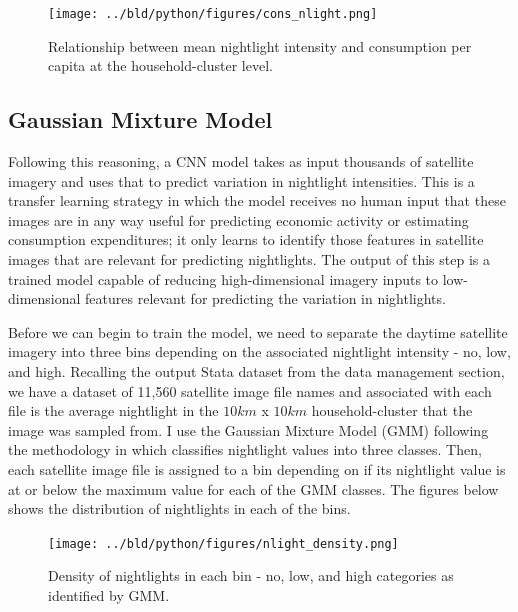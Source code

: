 \documentclass[11pt, a4paper, leqno]{article}
\begin{document}
\begin{figure}[H]

\centering
    \texttt{[image: ../bld/python/figures/cons\_nlight.png]}
    \caption{Relationship between mean nightlight intensity and consumption per capita at the household-cluster level.}
    \label{fig:python-predictions}

\end{figure}

\subsection{Gaussian Mixture Model}

Following this reasoning, a CNN model takes as input thousands of satellite imagery and uses that to predict variation in nightlight intensities. This is a transfer learning strategy in which the model receives no human input that these images are in any way useful for predicting economic activity or estimating consumption expenditures; it only learns to identify those features in satellite images that are relevant for predicting nightlights. The output of this step is a trained model capable of reducing high-dimensional imagery inputs to low-dimensional features relevant for predicting the variation in nightlights.

Before we can begin to train the model, we need to separate the daytime satellite imagery into three bins depending on the associated nightlight intensity - no, low, and high. Recalling the output Stata dataset from the data management section, we have a dataset of 11,560 satellite image file names and associated with each file is the average nightlight in the $10km$ x $10km$ household-cluster that the image was sampled from. I use the Gaussian Mixture Model (GMM) following the methodology in \citet{jean2016combining} which classifies nightlight values into three classes. Then, each satellite image file is assigned to a bin depending on if its nightlight value is at or below the maximum value for each of the GMM classes. The figures below shows the distribution of nightlights in each of the bins.

\begin{figure}[H]

\centering
    \texttt{[image: ../bld/python/figures/nlight\_density.png]}
    \caption{Density of nightlights in each bin - no, low, and high categories as identified by GMM.}
    \label{fig:python-predictions}

\end{figure}
\end{document}
